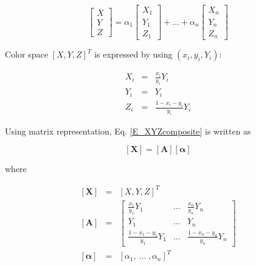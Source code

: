 \documentclass[dvipdfmx,uplatex]{article}
\begin{document}
\begin{equation}
  \label{E_XYZcomposite}
  \left[
    \begin{array}{c}
      X \\
      Y \\
      Z
    \end{array}
  \right]
   = \alpha_1
  \left[
    \begin{array}{c}
        X_1 \\
        Y_1 \\
        Z_1
    \end{array}
  \right]
   + \ldots + \alpha_n
  \left[
    \begin{array}{c}
        X_n \\
        Y_n \\
        Z_n
    \end{array}
  \right]
\end{equation}

Color space $[X, Y, Z]^T$ is expressed by using $(x_i, y_i, Y_i)$:

\begin{eqnarray}
  \label{E_xyY2XYZ}
  X_i & = & \frac{x_i}{y_i}  Y_i \\
  Y_i & = & Y_i \\
  Z_i & = & \frac{1 - x_i - y_i}{y_i} Y_i
\end{eqnarray}

Using matrix representation, Eq. \ref{E_XYZcomposite} is written as

\begin{equation}
  \label{E_X=AY}
  \left[ \boldsymbol{X} \right] =
  \left[ \boldsymbol{A} \right]
  \left[ \boldsymbol{\alpha} \right]
\end{equation}

where

\begin{eqnarray}
  \left[ \boldsymbol{X} \right] &=&
  \left[ X, Y, Z \right]^T \\
  \left[ \boldsymbol{A} \right] &=&
  \left[
    \begin{array}{ccc}
      \frac{x_1}{y_1} Y_1 & \ldots & \frac{x_n}{y_n} Y_n \\
      Y_1 & \ldots & Y_n \\
      \frac{1 - x_1 - y_1}{y_1}Y_1 & \ldots & \frac{1 - x_n - y_n}{y_n}Y_n
    \end{array}
  \right] \\
  \left[ \boldsymbol{\alpha} \right] &=&
  \left[ \alpha_1,\ \ldots\ , \alpha_n \right]^T
\end{eqnarray}
\end{document}
